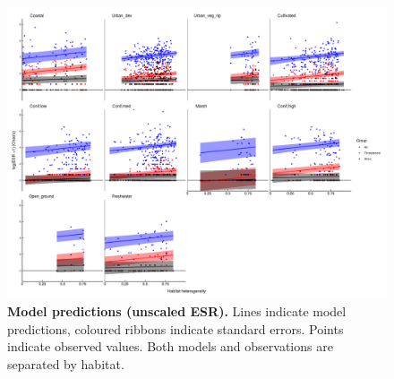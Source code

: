 \documentclass{article}
\begin{document}
\FloatBarrier
\begin{figure}[!h]
    \centering
    \includegraphics[width=1\textwidth]{Predictions_ribbon.png}
    \caption{\textbf{Model predictions (unscaled ESR).} Lines indicate model predictions, coloured ribbons indicate standard errors. Points indicate observed values. Both models and observations are separated by habitat.}
    \label{fig:pred_ribbon}
\end{figure}
\end{document}
